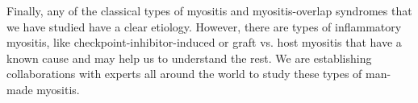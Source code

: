 Finally, any of the classical types of myositis and myositis-overlap syndromes that we have studied have a clear etiology. However, there are types of inflammatory myositis, like checkpoint-inhibitor-induced or graft vs. host myositis that have a known cause and may help us to understand the rest. We are establishing collaborations with experts all around the world to study these types of man-made myositis.

 